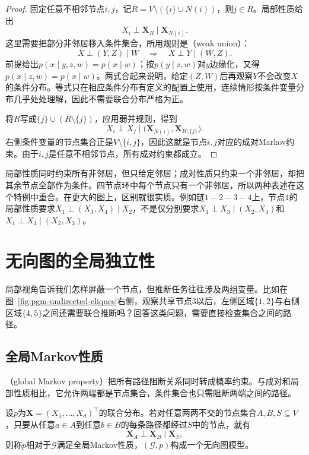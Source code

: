 \begin{proof}
固定任意不相邻节点$i,j$，记$R=V\setminus(\{i\}\cup N(i))$，则$j\in R$。局部性质给出
\[
  X_i\perp\bm{X}_R\mid\bm{X}_{N(i)}.
\]
这里需要把部分非邻居移入条件集合，所用规则是（weak union）：
\[
  X\perp(Y,Z)\mid W
  \quad\Longrightarrow\quad
  X\perp Y\mid(W,Z).
\]
前提给出$p(x\mid y,z,w)=p(x\mid w)$；按$p(y\mid z,w)$对$y$边缘化，又得$p(x\mid z,w)=p(x\mid w)$。两式合起来说明，给定$(Z,W)$后再观察$Y$不会改变$X$的条件分布。等式只在相应条件分布有定义的配置上使用，连续情形按条件变量分布几乎处处理解，因此不需要联合分布严格为正。

将$R$写成$\{j\}\cup(R\setminus\{j\})$，应用弱并规则，得到
\[
  X_i\perp X_j
  \mid\bigl(\bm{X}_{N(i)},\bm{X}_{R\setminus\{j\}}\bigr).
\]
右侧条件变量的节点集合正是$V\setminus\{i,j\}$，因此这就是节点$i,j$对应的成对Markov约束。由于$i,j$是任意不相邻节点，所有成对约束都成立。
\end{proof}

局部性质同时约束所有非邻居，但只给定邻居；成对性质只约束一个非邻居，却把其余节点全部作为条件。四节点环中每个节点只有一个非邻居，所以两种表述在这个特例中重合。在更大的图上，区别就很实质。例如链$1-2-3-4$上，节点$1$的局部性质要求$X_1\perp(X_3,X_4)\mid X_2$，不是仅分别要求$X_1\perp X_3\mid(X_2,X_4)$和$X_1\perp X_4\mid(X_2,X_3)$。

\section{无向图的全局独立性}
\label{sec:pgm-undirected-global-independence}

局部视角告诉我们怎样屏蔽一个节点，但推断任务往往涉及两组变量。比如在图~\ref{fig:pgm-undirected-cliques}右侧，观察共享节点$3$以后，左侧区域$\{1,2\}$与右侧区域$\{4,5\}$之间还需要联合推断吗？回答这类问题，需要直接检查集合之间的路径。

\subsection{全局Markov性质}
\label{sec:pgm-undirected-global}

（global Markov property）把所有路径阻断关系同时转成概率约束。与成对和局部性质相比，它允许两端都是节点集合，条件集合也只需阻断两端之间的路径。

\begin{definition}[全局Markov性质]
  \label{def:pgm-undirected-model}
  设$p$为$\bm{X}=(X_1,\ldots,X_d)^{\top}$的联合分布。若对任意两两不交的节点集合$A,B,S\subseteq V$，只要从任意$a\in A$到任意$b\in B$的每条路径都经过$S$中的节点，就有
  \begin{equation}
    \bm{X}_A\perp\bm{X}_B\mid\bm{X}_S,
    \label{eq:pgm-undirected-global}
  \end{equation}
  则称$p$相对于$\mathcal{G}$满足全局Markov性质，$(\mathcal{G},p)$构成一个无向图模型。
\end{definition}

